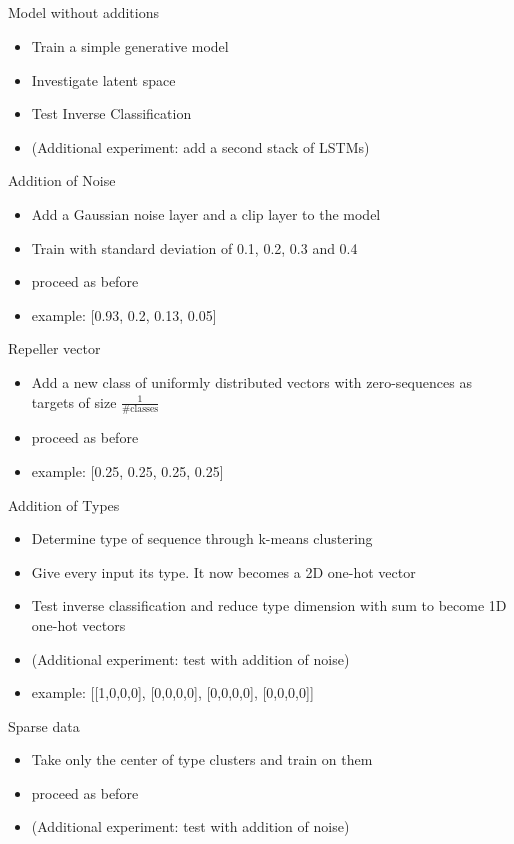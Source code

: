 \documentclass[compress]{beamer}
\begin{document}
	\subsection{ } %
	\begin{frame}{Model without additions}
		\begin{itemize}
			\item Train a simple generative model
			\item Investigate latent space 
			\item Test Inverse Classification
			\item (Additional experiment: add a second stack of LSTMs)
		\end{itemize}
	\end{frame}
	\begin{frame}{Addition of Noise}
		\begin{itemize}
			\item Add a Gaussian noise layer and a clip layer to the model
			\item Train with standard deviation of 0.1, 0.2, 0.3 and 0.4
			\item proceed as before
			\item example: [0.93, 0.2, 0.13, 0.05]
		\end{itemize}
	\end{frame}
	\begin{frame}{Repeller vector}
		\begin{itemize}
			\item Add a new class of uniformly distributed vectors with zero-sequences as targets of size $\frac{1}{\text{\#classes}}$ 
			\item proceed as before
			\item example: [0.25, 0.25, 0.25, 0.25]
		\end{itemize}
	\end{frame}
	\begin{frame}{Addition of Types}
		\begin{itemize}
			\item Determine type of sequence through k-means clustering
			\item Give every input its type. It now becomes a 2D one-hot vector
			\item Test inverse classification and reduce type dimension with sum to become 1D one-hot vectors
			\item (Additional experiment: test with addition of noise)
			\item example: [[1,0,0,0], [0,0,0,0], [0,0,0,0], [0,0,0,0]]
		\end{itemize}
	\end{frame}
	\begin{frame}{Sparse data}
		\begin{itemize}
			\item Take only the center of type clusters and train on them
			\item proceed as before
			\item (Additional experiment: test with addition of noise)
		\end{itemize}
	\end{frame}
\end{document}
